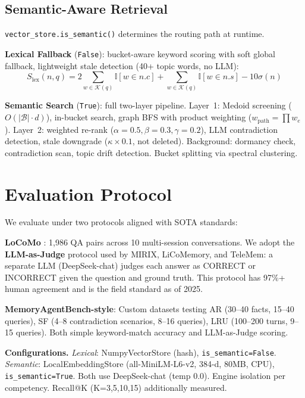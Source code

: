 \documentclass{article}
\theoremstyle{plain}\newtheorem{theorem}{Theorem}[section]
\theoremstyle{definition}\newtheorem{definition}[theorem]{Definition}
\newcommand{\MAB}{MemoryAgentBench\xspace}
\begin{document}
\subsection{Semantic-Aware Retrieval}

\texttt{vector\_store.is\_semantic()} determines the routing path at runtime.

\textbf{Lexical Fallback} (\texttt{False}): bucket-aware keyword scoring with soft
global fallback, lightweight stale detection (40+ topic words, no LLM):
\begin{equation}
S_{\text{lex}}(n,q) = 2\sum_{w \in \mathcal{K}(q)}\mathbb{I}[w \in n.c]
  + \sum_{w \in \mathcal{K}(q)}\mathbb{I}[w \in n.s] - 10\sigma(n)
\label{eq:lexical}
\end{equation}

\textbf{Semantic Search} (\texttt{True}): full two-layer pipeline. Layer~1: Medoid
screening ($O(|\mathcal{B}|\cdot d)$), in-bucket search, graph BFS with product
weighting ($w_{\text{path}}=\prod w_e$). Layer~2: weighted re-rank
($\alpha=0.5,\beta=0.3,\gamma=0.2$), LLM contradiction detection, stale downgrade
($\kappa \times 0.1$, not deleted). Background: dormancy check, contradiction scan,
topic drift detection. Bucket splitting via spectral clustering.

\section{Evaluation Protocol}

We evaluate under two protocols aligned with SOTA standards:

\textbf{LoCoMo} \cite{maharana2024locomo}: 1,986 QA pairs across 10 multi-session
conversations. We adopt the \textbf{LLM-as-Judge} protocol used by MIRIX, LiCoMemory,
and TeleMem: a separate LLM (DeepSeek-chat) judges each answer as CORRECT or INCORRECT
given the question and ground truth. This protocol has 97\%+ human agreement
\cite{wu2025longmemeval} and is the field standard as of 2025.

\textbf{\MAB{}-style}: Custom datasets testing AR (30--40 facts, 15--40 queries),
SF (4--8 contradiction scenarios, 8--16 queries), LRU (100--200 turns, 9--15 queries).
Both simple keyword-match accuracy and LLM-as-Judge scoring.

\textbf{Configurations.} \textit{Lexical}: NumpyVectorStore (hash),
\texttt{is\_semantic=False}. \textit{Semantic}: LocalEmbeddingStore (all-MiniLM-L6-v2,
384-d, 80MB, CPU), \texttt{is\_semantic=True}. Both use DeepSeek-chat (temp 0.0).
Engine isolation per competency. Recall@K (K=3,5,10,15) additionally measured.
\end{document}
